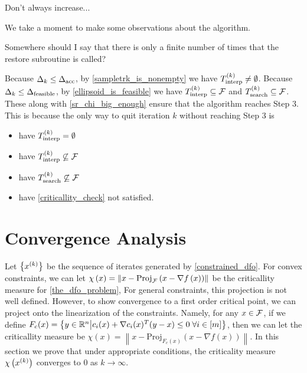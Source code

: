\begin{boxedcomment}
Don't always increase...
\end{boxedcomment}


\color{red}

We take a moment to make some observations about the algorithm.


Somewhere should I say that there is only a finite number of times that the restore subroutine is called?


Because $\Delta_k \le {\Delta_{\textrm{acc}}}$, by \cref{sampletrk_is_nonempty} we have ${T_{\text{interp}}^{(k)}} \ne \emptyset$.
Because $\Delta_k \le {\Delta_{\textrm{feasible}}}$, by \cref{ellipsoid_is_feasible} we have ${T_{\text{interp}}^{(k)}} \subseteq {\mathcal F}$ and ${T_{\text{search}}^{(k)}} \subseteq {\mathcal F}$.
These along with \cref{sr_chi_big_enough} ensure that the algorithm reaches Step 3.
This is because the only way to quit iteration $k$ without reaching Step 3 is
\begin{itemize}
\item have ${T_{\text{interp}}^{(k)}} = \emptyset$
\item have ${T_{\text{interp}}^{(k)}} \not \subseteq {\mathcal F}$
\item have ${T_{\text{search}}^{(k)}} \not \subseteq {\mathcal F}$
\item have \cref{criticallity_check} not satisfied.
\end{itemize}
\color{black}

\section{Convergence Analysis}
\label{convex_convergence_analysis}

Let $\left\{x^{(k)}\right\}$ be the sequence of iterates generated by \cref{constrained_dfo}.
For convex constraints, we can let $\chi\left(x\right) = \left\|x - \textrm{Proj}_{{\mathcal F}}\left(x- \nabla f\left(x\right)\right)\right\|$ be the criticallity measure for \cref{the_dfo_problem}, 
For general constraints, this projection is not well defined.
However, to show convergence to a first order critical point, we can project onto the linearization of the constraints.
Namely, for any $x \in {\mathcal F}$, if we define $F_c(x) = \left\{y \in \mathbb R^n \big | c_i(x) + \nabla c_i(x)^T(y - x) \le 0 \; \forall i \in [m] \right\}$, 
then we can let the criticallity measure be
$\chi\left(x\right) = \left\|x - \textrm{Proj}_{F_c(x)}\left(x- \nabla f\left(x\right)\right)\right\|$.
In this section we prove that under appropriate conditions, the criticality measure $\chi\left(x^{(k)}\right)$ converges to $0$ as $k\to\infty$.

